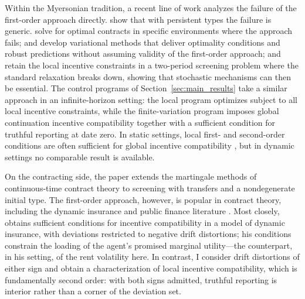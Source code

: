 \documentclass[12pt]{article}
\begin{document}
Within the Myersonian tradition, a recent line of work analyzes the failure of
the first-order approach directly.
\citet{battaglini2019optimal} show that with persistent types the failure is
generic. \citet{krasikov2021theory,krasikov2026dynamic} solve for optimal
contracts in specific environments where the approach fails;
\citet{garrett2015dynamic} and \citet{garrett2018robust} develop variational
methods that deliver optimality conditions and robust predictions without assuming
validity of the first-order approach; and
\citet{li2025stochastic} retain the local incentive constraints in a two-period
screening problem where the standard relaxation breaks down, showing
that stochastic mechanisms can then be essential. The control programs of
Section~\ref{sec:main_results} take a similar approach in an infinite-horizon
setting: the local
program optimizes subject to all local incentive constraints, while the
finite-variation program imposes global continuation incentive compatibility
together with a sufficient condition for truthful reporting at date zero. In
static settings, local first- and second-order
conditions are often sufficient for global incentive compatibility
\citep{carroll2012local}, but in dynamic settings no comparable result is
available.

On the contracting side, the paper extends the martingale methods of
continuous-time contract theory \citep{sannikov2008,williams2011persistent} to
screening with transfers and a nondegenerate initial type. The first-order
approach, however, is popular in contract theory, including the dynamic insurance
and public finance literature
\citep[e.g.,][]{zhang2009dynamic,kapicka2013efficient,farhi2013insurance}.
Most closely, \citet{williams2011persistent}
obtains sufficient conditions for incentive compatibility in a model
of dynamic insurance, with deviations restricted to negative drift distortions;
his conditions constrain the loading of the agent's promised marginal
utility---the counterpart, in his setting, of the rent volatility here. In contrast, I
consider drift distortions of either sign and obtain a characterization
of local incentive compatibility, which is fundamentally second order: with both
signs admitted, truthful reporting is interior rather than a corner of the
deviation set. 
\end{document}
